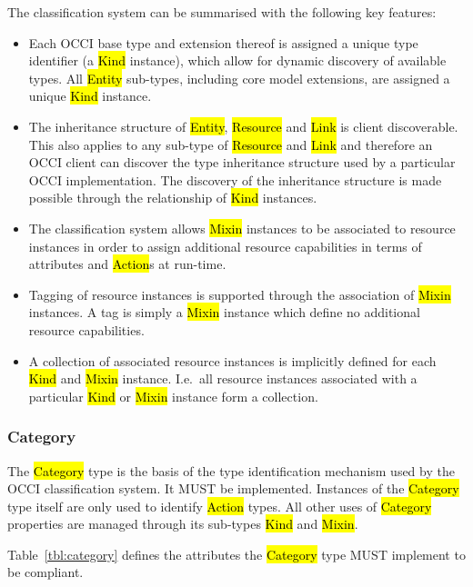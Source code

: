 \documentclass[10pt,a4paper]{article}
\begin{document}
The classification system can be summarised with the following key
features:

\begin{itemize}
  \item Each OCCI base type and extension thereof is assigned a unique
    type identifier (a \hl{Kind} instance), which allow for dynamic
    discovery of available types. All \hl{Entity} sub-types, including
    core model extensions, are assigned a unique \hl{Kind} instance.
  \item The inheritance structure of \hl{Entity}, \hl{Resource} and
    \hl{Link} is client discoverable. This also applies to any
    sub-type of \hl{Resource} and \hl{Link} and therefore an OCCI
    client can discover the type inheritance structure used by a
    particular OCCI implementation. The discovery of the inheritance
    structure is made possible through the relationship of \hl{Kind}
    instances.
  \item The classification system allows \hl{Mixin} instances to be
    associated to resource instances in order to assign additional
    resource capabilities in terms of attributes and \hl{Action}s at
    run-time.
  \item Tagging of resource instances is supported through the
    association of \hl{Mixin} instances. A tag is simply a \hl{Mixin}
    instance which define no additional resource capabilities.
  \item A collection of associated resource instances is implicitly
    defined for each \hl{Kind} and \hl{Mixin} instance. I.e.~all
    resource instances associated with a particular \hl{Kind} or
    \hl{Mixin} instance form a collection.
\end{itemize}

\subsubsection{Category}
\label{sec:category}
The \hl{Category} type is the basis of the type identification
mechanism used by the OCCI classification system. It MUST be
implemented. Instances of the \hl{Category} type itself are only used
to identify \hl{Action} types. All other uses of \hl{Category}
properties are managed through its sub-types \hl{Kind} and \hl{Mixin}.

Table~\ref{tbl:category} defines the attributes the \hl{Category} type
MUST implement to be compliant.
\end{document}
